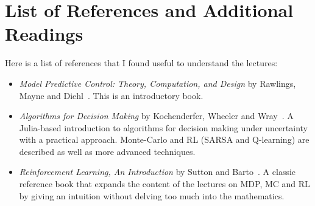 \chapter{List of References and Additional Readings}
\label{chap:references}

Here is a list of references that I found useful to understand the lectures:
\begin{itemize}
\item \textit{Model Predictive Control: Theory, Computation, and Design} by Rawlings, Mayne and Diehl~\cite{MPC-diehl}. This is an introductory book.
\item \textit{Algorithms for Decision Making} by Kochenderfer, Wheeler and Wray~\cite{decision-making-kochenderfer}. A Julia-based introduction to algorithms for decision making under uncertainty with a practical approach. Monte-Carlo and RL (SARSA and Q-learning) are described as well as more advanced techniques.
\item \textit{Reinforcement Learning, An Introduction} by Sutton and Barto~\cite{reinforcement-learning-sutton-barto}. A classic reference book that expands the content of the lectures on MDP, MC and RL by giving an intuition without delving too much into the mathematics.
\end{itemize}


